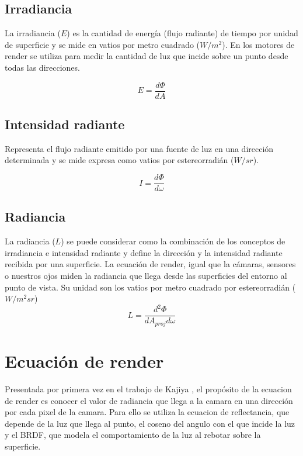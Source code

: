     \subsection*{Irradiancia}
        La irradiancia ($E$) es la cantidad de energ\'ia (flujo radiante) de tiempo por unidad de superficie y
        se mide en vatios por metro cuadrado ($W/m^2$). En los motores de render se utiliza
        para medir la cantidad de luz que incide sobre un punto desde todas las direcciones.

        \begin{equation}
            E = \dfrac{d\Phi}{dA}
        \end{equation}

    \subsection*{Intensidad radiante}
        Representa el flujo radiante emitido por una fuente de luz en una direcci\'on determinada y se mide expresa
        como vatios por estereorradi\'an ($W/sr$).

        \begin{equation}
            I = \dfrac{d\Phi}{d\omega}
        \end{equation}

    \subsection*{Radiancia}
        La radiancia ($L$) se puede considerar como la combinaci\'on de los conceptos de irradiancia e intensidad radiante y
        define la direcci\'on y la intensidad radiante recibida por una superficie. La ecuaci\'on de render, igual que la c\'amaras,
        sensores o nuestros ojos miden la radiancia que llega desde las superficies del entorno al punto de vista. Su unidad son los
        vatios por metro cuadrado por estereorradi\'an (${W}/{m^2sr}$)
        \begin{equation}
            L = \dfrac{d^2\Phi}{dA_{proj}d\omega}
        \end{equation}

\section{Ecuaci\'on de render}
Presentada por primera vez en el trabajo de Kajiya \autocite{kajiya}, el prop\'osito de la ecuacion de render es conocer el valor de
radiancia que llega a la camara en una direcci\'on por cada pixel de la camara. Para ello se utiliza la ecuacion de reflectancia,
que depende de la luz que llega al punto, el coseno del angulo con el que incide la luz y el BRDF, que modela el comportamiento
de la luz al rebotar sobre la superficie.\\

